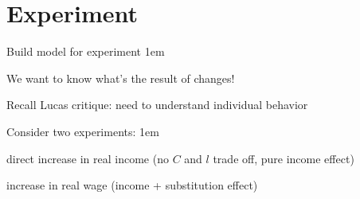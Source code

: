 \documentclass[11pt,aspectratio=43]{beamer}
\let\olditemize=\itemize
\let\endolditemize=\enditemize
\renewenvironment{itemize}{\olditemize \itemsep1em}{\endolditemize}
\let\oldenumerate=\enumerate
\let\endoldenumerate=\endenumerate
\renewenvironment{enumerate}{\oldenumerate \itemsep1em}{ \endoldenumerate}
\theoremstyle{definition}
\begin{document}
\section{Experiment}
\label{sec:Experiment}

\begin{frame}{Build model for experiment}
\label{slide:Build_model_for_experiment}
    \begin{itemize}
        \item We want to know \alert{what's the result of changes}!
        \item Recall \alert{Lucas critique}: need to understand individual behavior
        \item Consider two experiments:
        \begin{enumerate}
            \item direct increase in \alert{real income} (no $ C $ and $ l $ trade off, pure \alert{income effect})
            \item increase in \alert{real wage} (\alert{income + substitution effect})
        \end{enumerate}
    \end{itemize}
\end{frame}
\end{document}
